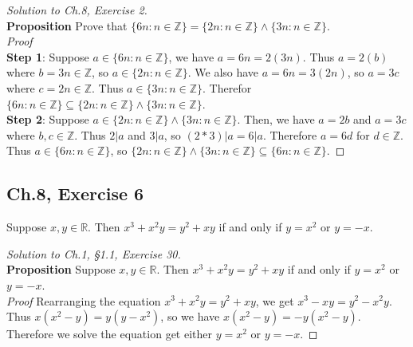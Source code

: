 \documentclass[12pt]{amsart}
\numberwithin{equation}{section}
\theoremstyle{definition}
\theoremstyle{remark}
\begin{document}
\begin{proof}[Solution to Ch.8, Exercise 2]
\ \\
\textbf{Proposition}  Prove that $ \{ 6n : n \in \mathbb{Z} \} = \{ 2n : n \in \mathbb{Z} \} \land \{ 3n : n \in \mathbb{Z} \} $. \\
\textit{Proof}  \\
\textbf{Step 1}: Suppose $ a \in \{ 6n : n \in \mathbb{Z} \} $, we have $ a = 6n = 2(3n) $. Thus $ a = 2(b) $ where $ b = 3n \in \mathbb{Z} $, so $ a \in \{ 2n : n \in \mathbb{Z} \} $. We also have $ a = 6n = 3(2n) $, so $ a = 3c $ where $ c = 2n \in \mathbb{Z} $. Thus $ a \in \{ 3n : n \in \mathbb{Z} \} $. Therefor $ \{ 6n : n \in \mathbb{Z} \} \subseteq \{ 2n : n \in \mathbb{Z} \} \land \{ 3n : n \in \mathbb{Z} \} $. \\
\textbf{Step 2}: Suppose $ a \in \{ 2n : n \in \mathbb{Z} \} \land \{ 3n : n \in \mathbb{Z} \} $. Then, we have $ a = 2b $ and $ a = 3c $ where $ b, c \in \mathbb{Z} $. Thus $ 2 | a $ and $ 3 | a $, so $ (2 * 3) | a = 6 | a $.  Therefore $ a = 6d $ for $ d \in \mathbb{Z} $. Thus $ a \in \{ 6n : n \in \mathbb{Z} \} $, so $ \{ 2n : n \in \mathbb{Z} \} \land \{ 3n : n \in \mathbb{Z} \} \subseteq \{ 6n : n \in \mathbb{Z} \} $.

\end{proof}




\subsection*{Ch.8,  Exercise 6}  Suppose $ x, y \in \mathbb{R} $. Then $ x^3 + x^2y = y^2 + xy $ if and only if $ y = x^2 $ or $ y = -x $.

\begin{proof}[Solution to Ch.1, \S 1.1,  Exercise 30] 
\ \\
\textbf{Proposition} Suppose $ x, y \in \mathbb{R} $. Then $ x^3 + x^2y = y^2 + xy $ if and only if $ y = x^2 $ or $ y = -x $.\\
\textit{Proof} Rearranging the equation $ x^3 + x^2y = y^2 + xy $, we get $ x^3 - xy = y^2 - x^2 y $. Thus $ x ( x^2 - y ) = y ( y - x^2 ) $, so we have $ x ( x^2 - y) = - y ( x^2 - y) $. Therefore we solve the equation get either $ y = x^2 $ or $ y = -x $.
\end{proof}



\end{document}
